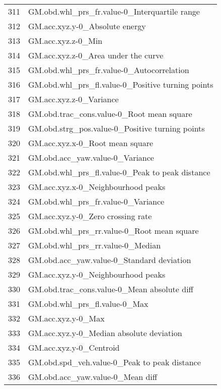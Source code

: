 \begin{tabular}{ll}
311 &      GM.obd.whl\_prs\_fr.value-0\_Interquartile range \\
312 &                     GM.acc.xyz.y-0\_Absolute energy \\
313 &                                 GM.acc.xyz.z-0\_Min \\
314 &                GM.acc.xyz.z-0\_Area under the curve \\
315 &          GM.obd.whl\_prs\_fr.value-0\_Autocorrelation \\
316 &  GM.obd.whl\_prs\_fl.value-0\_Positive turning points \\
317 &                            GM.acc.xyz.z-0\_Variance \\
318 &          GM.obd.trac\_cons.value-0\_Root mean square \\
319 &    GM.obd.strg\_pos.value-0\_Positive turning points \\
320 &                    GM.acc.xyz.x-0\_Root mean square \\
321 &                    GM.obd.acc\_yaw.value-0\_Variance \\
322 &    GM.obd.whl\_prs\_fl.value-0\_Peak to peak distance \\
323 &                 GM.acc.xyz.x-0\_Neighbourhood peaks \\
324 &                 GM.obd.whl\_prs\_fr.value-0\_Variance \\
325 &                  GM.acc.xyz.y-0\_Zero crossing rate \\
326 &         GM.obd.whl\_prs\_rr.value-0\_Root mean square \\
327 &                   GM.obd.whl\_prs\_rr.value-0\_Median \\
328 &          GM.obd.acc\_yaw.value-0\_Standard deviation \\
329 &                 GM.acc.xyz.y-0\_Neighbourhood peaks \\
330 &        GM.obd.trac\_cons.value-0\_Mean absolute diff \\
331 &                      GM.obd.whl\_prs\_fl.value-0\_Max \\
332 &                                 GM.acc.xyz.y-0\_Max \\
333 &           GM.acc.xyz.y-0\_Median absolute deviation \\
334 &                            GM.acc.xyz.y-0\_Centroid \\
335 &       GM.obd.spd\_veh.value-0\_Peak to peak distance \\
336 &                   GM.obd.acc\_yaw.value-0\_Mean diff \\

\end{tabular}
